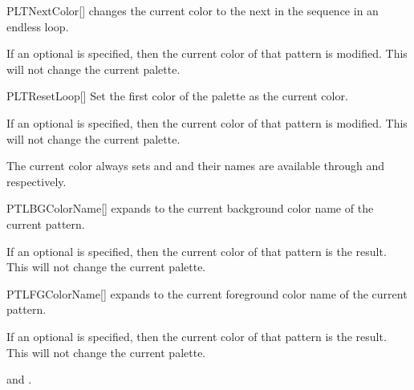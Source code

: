 \documentclass[a4paper, 11pt]{article}
\begin{document}
\begin{macro}{PLTNextColor}[]
     changes the current color to the next in the sequence in an endless loop.

    If an optional  is specified, then the current color of that pattern is modified. This will not change the current palette.
\end{macro}

\begin{macro}{PLTResetLoop}[]
    Set the first color of the palette as the current color.

    If an optional  is specified, then the current color of that pattern is modified. This will not change the current palette.
\end{macro}

The current color always sets  and  and their names are available through  and  respectively.

\begin{macro}{PTLBGColorName}[]
     expands to the current background color name of the current pattern.

    If an optional  is specified, then the current color of that pattern is the result. This will not change the current palette.
\end{macro}

\begin{macro}{PTLFGColorName}[]
     expands to the current foreground color name of the current pattern.

    If an optional  is specified, then the current color of that pattern is the result. This will not change the current palette.
\end{macro}

\begin{tcblisting}{}

    \forcsvlist{%
        \textcolor{PLTBGColor}{\textbf{\PLTBGColorName}}, %
        \PLTNextColor%
    }{{}, {}, {}, {}, {}, {}}%
    and \textcolor{PLTBGColor}{\textbf{\PLTBGColorName}}.

    \medskip
    \PLTResetLoop
    \forcsvlist{%
        \textcolor{PLTBGColor}{\rule{1cm}{1em}}%
        \PLTNextColor%
    }{{}, {}, {}, {}, {}, {}, {}}%
\end{tcblisting}
\end{document}
